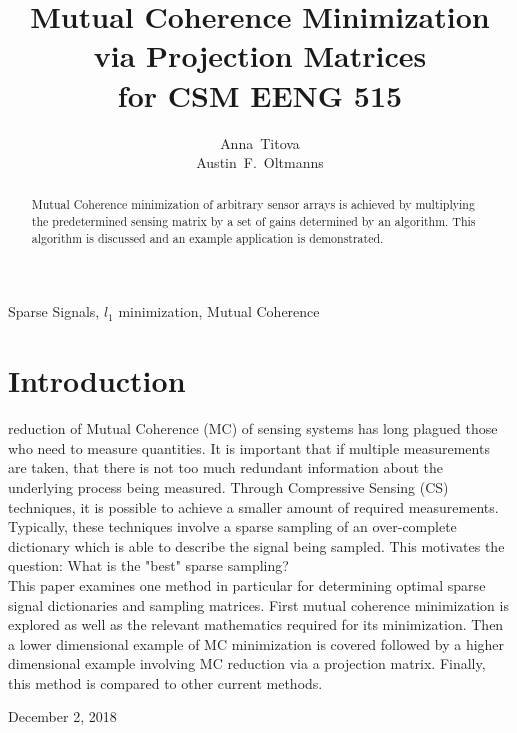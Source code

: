 \documentclass[journal]{IEEEtran}
\begin{document}
\title{Mutual Coherence Minimization \\via Projection Matrices\\ for CSM EENG 515}


\author{ 
Anna~Titova \\
Austin~F.~Oltmanns%
}

\maketitle


\begin{abstract}
Mutual Coherence minimization of arbitrary sensor arrays is achieved 
by multiplying the predetermined sensing matrix by a set of gains
determined by an algorithm. This algorithm is discussed and an example
application is demonstrated.
\end{abstract}
\begin{IEEEkeywords}
Sparse Signals, $l_1$ minimization, Mutual Coherence
\end{IEEEkeywords}

\section{Introduction}
 reduction of Mutual Coherence (MC) of sensing systems has long plagued
those who need to measure quantities. It is important that if multiple measurements
are taken, that there is not too much redundant information about the underlying 
process being measured. Through Compressive Sensing (CS) techniques, it is possible to achieve
a smaller amount of required measurements. Typically, these techniques involve a sparse
sampling of an over-complete dictionary which is able to describe the signal being sampled. This 
motivates the question: What is the "best" sparse sampling? \\
This paper examines one method in particular for determining optimal sparse signal 
dictionaries and sampling matrices. First mutual coherence minimization is explored as well
as the relevant mathematics required for its minimization. Then a lower dimensional example
of MC minimization is covered followed by a higher dimensional example involving MC reduction
via a projection matrix. Finally, this method is compared to other current methods.

\hfill December 2, 2018
\end{document}
